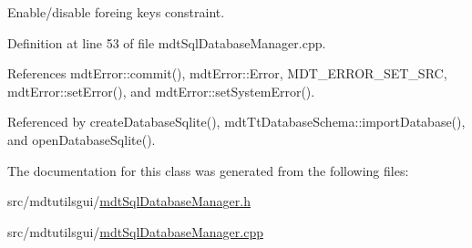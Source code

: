 Enable/disable foreing keys constraint. 



Definition at line 53 of file mdt\-Sql\-Database\-Manager.\-cpp.



References mdt\-Error\-::commit(), mdt\-Error\-::\-Error, M\-D\-T\-\_\-\-E\-R\-R\-O\-R\-\_\-\-S\-E\-T\-\_\-\-S\-R\-C, mdt\-Error\-::set\-Error(), and mdt\-Error\-::set\-System\-Error().



Referenced by create\-Database\-Sqlite(), mdt\-Tt\-Database\-Schema\-::import\-Database(), and open\-Database\-Sqlite().



The documentation for this class was generated from the following files\-:\begin{DoxyCompactItemize}
\item 
src/mdtutilsgui/\hyperlink{mdt_sql_database_manager_8h}{mdt\-Sql\-Database\-Manager.\-h}\item 
src/mdtutilsgui/\hyperlink{mdt_sql_database_manager_8cpp}{mdt\-Sql\-Database\-Manager.\-cpp}\end{DoxyCompactItemize}
